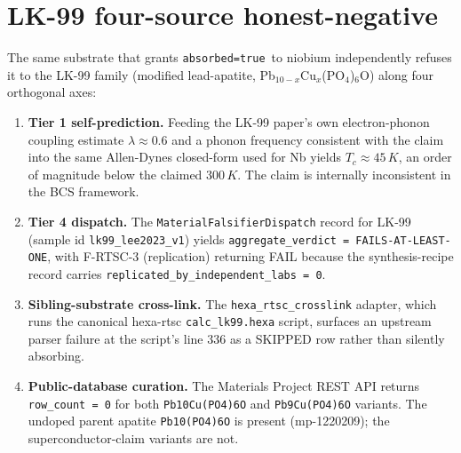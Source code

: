 \documentclass[11pt,a4paper]{article}
\newcommand{\absorbedtrue}{\textcolor{honestgreen}{\texttt{absorbed=true}}}
\begin{document}
\section{LK-99 four-source honest-negative}
\label{sec:lk99-neg}

The same substrate that grants \absorbedtrue\ to niobium independently
refuses it to the LK-99 family (modified lead-apatite,
Pb$_{10-x}$Cu$_x$(PO$_4$)$_6$O) along four orthogonal axes:

\begin{enumerate}\itemsep0.4em
\item \textbf{Tier 1 self-prediction.} Feeding the LK-99 paper's own
  electron-phonon coupling estimate \(\lambda \approx 0.6\) and a
  phonon frequency consistent with the claim into the same Allen-Dynes
  closed-form used for Nb yields \(T_{c} \approx 45\,K\), an order of
  magnitude below the claimed \(300\,K\). The claim is internally
  inconsistent in the BCS framework.
\item \textbf{Tier 4 dispatch.} The
  \texttt{MaterialFalsifierDispatch} record for LK-99 (sample id
  \texttt{lk99\_lee2023\_v1}) yields
  \texttt{aggregate\_verdict = FAILS-AT-LEAST-ONE}, with F-RTSC-3
  (replication) returning FAIL because the synthesis-recipe record
  carries \texttt{replicated\_by\_independent\_labs = 0}.
\item \textbf{Sibling-substrate cross-link.} The
  \texttt{hexa\_rtsc\_crosslink} adapter, which runs the canonical
  hexa-rtsc \texttt{calc\_lk99.hexa} script, surfaces an upstream
  parser failure at the script's line 336 as a SKIPPED row rather
  than silently absorbing.
\item \textbf{Public-database curation.} The Materials Project REST
  API \cite{jain2013materialsproject} returns \texttt{row\_count =
  0} for both \texttt{Pb10Cu(PO4)6O} and \texttt{Pb9Cu(PO4)6O}
  variants. The undoped parent apatite \texttt{Pb10(PO4)6O} is
  present (mp-1220209); the superconductor-claim variants are not.
\end{enumerate}
\end{document}
